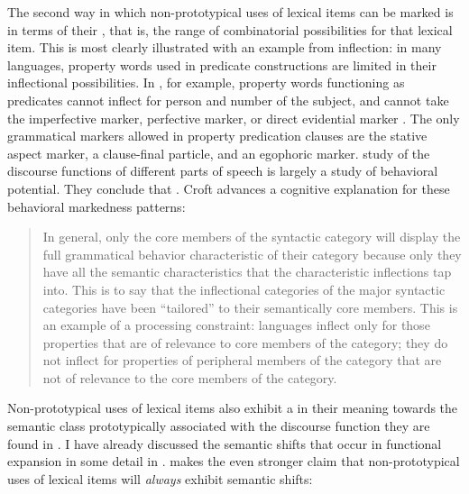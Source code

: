 The second way in which non-prototypical uses of lexical items can be marked is in terms of their , that is, the range of combinatorial possibilities for that lexical item. This is most clearly illustrated with an example from inflection: in many languages, property words used in predicate constructions are limited in their inflectional possibilities. In , for example, property words functioning as predicates cannot inflect for person and number of the subject, and cannot take the imperfective marker, perfective marker, or direct evidential marker \parencite[96--97]{Bai2019}. The only grammatical markers allowed in property predication clauses are the stative aspect marker, a clause-final particle, and an egophoric marker.  study of the discourse functions of different parts of speech is largely a study of behavioral potential. They conclude that . Croft advances a cognitive explanation for these behavioral markedness patterns:

\blockquote[{\cite[86]{Croft1991}}]{In general, only the core members of the syntactic category will display the full grammatical behavior characteristic of their category because only they have all the semantic characteristics that the characteristic inflections tap into. This is to say that the inflectional categories of the major syntactic categories have been \enquote{tailored} to their semantically core members. This is an example of a processing constraint: languages inflect only for those properties that are of relevance to core members of the category; they do not inflect for properties of peripheral members of the category that are not of relevance to the core members of the category.}

Non-prototypical uses of lexical items also exhibit a  in their meaning towards the semantic class prototypically associated with the discourse function they are found in \parencites[96]{Croft2000}[73]{Croft2001b}[68]{CroftLier2012}. I have already discussed the semantic shifts that occur in functional expansion in some detail in . \textcite[73]{Croft2001b} makes the even stronger claim that non-prototypical uses of lexical items will \emph{always} exhibit semantic shifts:

